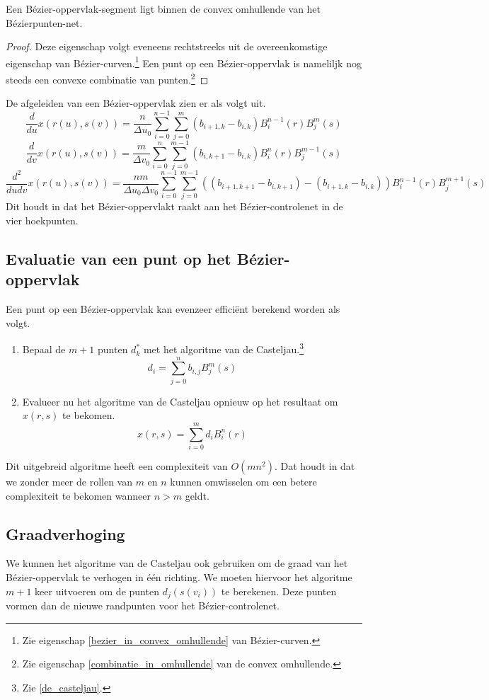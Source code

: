 \documentclass[computergesteund_ontwerp_van_curven_en_oppervlakken.tex]{subfiles}
\begin{document}
\begin{ei}
Een B\'ezier-oppervlak-segment ligt binnen de convex omhullende van het B\'ezierpunten-net.
\begin{proof}
Deze eigenschap volgt eveneens rechtstreeks uit de overeenkomstige eigenschap van B\'ezier-curven.\footnote{Zie eigenschap \ref{bezier_in_convex_omhullende} van B\'ezier-curven.} Een punt op een B\'ezier-oppervlak is nameliljk nog steeds een convexe combinatie van punten.\footnote{Zie eigenschap \ref{combinatie_in_omhullende} van de convex omhullende.}
\end{proof}
\end{ei}

\begin{ei}
De afgeleiden van een B\'ezier-oppervlak zien er als volgt uit.
\[
\frac{d}{du}x(r(u),s(v)) = \frac{n}{\Delta u_0}\sum_{i=0}^{n-1}\sum_{j=0}^{m}(b_{i+1,k}-b_{i,k})B_{i}^{n-1}(r)B_{j}^{m}(s)
\]
\[
\frac{d}{dv}x(r(u),s(v)) = \frac{m}{\Delta v_0}\sum_{i=0}^{n}\sum_{j=0}^{m-1}(b_{i,k+1}-b_{i,k})B_{i}^{n}(r)B_{j}^{m-1}(s)
\]
\[
\frac{d^2}{dudv}x(r(u),s(v)) = \frac{nm}{\Delta u_0\Delta v_0}\sum_{i=0}^{n-1}\sum_{j=0}^{m-1}\left((b_{i+1,k+1}-b_{i,k+1})-(b_{i+1,k}-b_{i,k})\right)B_{i}^{n-1}(r)B_{j}^{m+1}(s)
\]
Dit houdt in dat het B\'ezier-oppervlakt raakt aan het B\'ezier-controlenet in de vier hoekpunten.
\end{ei}

\subsection{Evaluatie van een punt op het B\'ezier-oppervlak}
Een punt op een B\'ezier-oppervlak kan evenzeer effici\"ent berekend worden als volgt.
\begin{enumerate}
\item Bepaal de $m+1$ punten $d_k^{*}$ met het algoritme van de Casteljau.\footnote{Zie \ref{de_casteljau}.}
\[
d_{i}= \sum_{j=0}^{n}b_{i,j}B_{j}^{m}(s)
\]
\item Evalueer nu het algoritme van de Casteljau opnieuw op het resultaat om $x(r,s)$ te bekomen.
\[
x(r,s) = \sum_{i=0}^{m}d_{i}B_{i}^{n}(r)
\]
\end{enumerate}
Dit uitgebreid algoritme heeft een complexiteit van $O(mn^2)$. Dat houdt in dat we zonder meer de rollen van $m$ en $n$ kunnen omwisselen om een betere complexiteit te bekomen wanneer $n>m$ geldt.

\subsection{Graadverhoging}
We kunnen het algoritme van de Casteljau ook gebruiken om de graad van het B\'ezier-oppervlak te verhogen in \'e\'en richting.
We moeten hiervoor het algoritme $m+1$ keer uitvoeren om de punten $d_{j}(s(v_i))$ te berekenen. Deze punten vormen dan de nieuwe randpunten voor het B\'ezier-controlenet.
\end{document}
